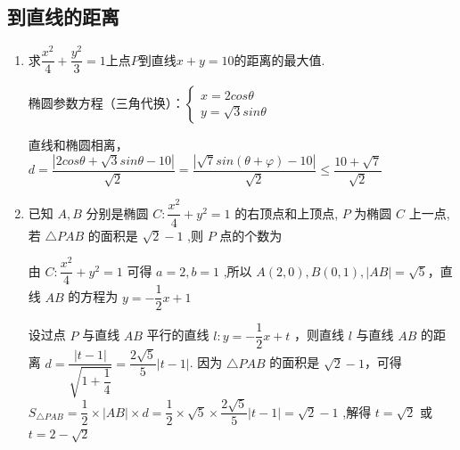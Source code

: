 \subsection*{到直线的距离}
\begin{enumerate}
    \item 求$\dfrac{x^{2}}{4}+\dfrac{y^{2}}{3} = 1$上点$P$到直线$x+y= 10$的距离的最大值.
    \begin{jieda}
        椭圆参数方程（三角代换）：$\left\{\begin{array}{l}
                x = 2cos\theta \\
                y = \sqrt{3}sin\theta
        \end{array}\right.$
        
        直线和椭圆相离，$d = \dfrac{|2cos\theta+\sqrt{3}sin\theta - 10|}{\sqrt{2}} = \dfrac{|\sqrt{7}sin(\theta+\varphi) - 10|}{\sqrt{2}} \leq \dfrac{10+\sqrt{7}}{\sqrt{2}}$
    \end{jieda}

    \item 已知 $A,B$ 分别是椭圆 $C : \dfrac{{x}^{2}}{4} + {y}^{2} = 1$ 的右顶点和上顶点, $P$ 为椭圆 $C$ 上一点,若 $\bigtriangleup  {PAB}$ 的面积是 $\sqrt{2} - 1$ ,则 $P$ 点的个数为
    \begin{jieda}
        由 $C : \dfrac{{x}^{2}}{4} + {y}^{2} = 1$ 可得 $a = 2,b = 1$ ,所以 $A\left( {2,0}\right) ,B\left( {0,1}\right) ,\left| {AB}\right|  = \sqrt{5}$，直线 ${AB}$ 的方程为 $y =  - \dfrac{1}{2}x + 1$

        设过点 $P$ 与直线 ${AB}$ 平行的直线 $l : y =  - \dfrac{1}{2}x + t$ ，则直线 $l$ 与直线 ${AB}$ 的距离 $d = \dfrac{\left| t - 1\right| }{\sqrt{1 + \dfrac{1}{4}}} = \dfrac{2\sqrt{5}}{5}\left| {t - 1}\right|$. 因为 $\bigtriangleup {PAB}$ 的面积是 $\sqrt{2} - 1$，可得 ${S}_{\bigtriangleup {PAB}} = \dfrac{1}{2} \times  \left| {AB}\right|  \times  d = \dfrac{1}{2} \times  \sqrt{5} \times  \dfrac{2\sqrt{5}}{5}\left| {t - 1}\right|  = \sqrt{2} - 1$ ,解得 $t = \sqrt{2}$ 或 $t = 2 - \sqrt{2}$

\end{jieda}
\end{enumerate}
